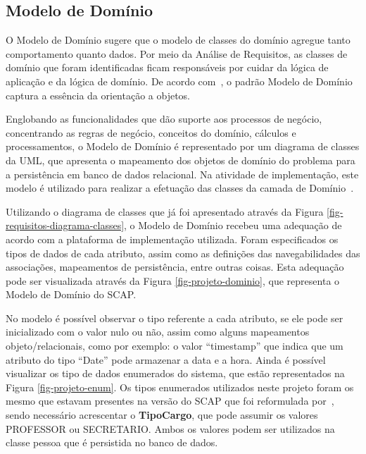 \subsection{Modelo de Domínio}
\label{sec-projeto-modelo-dominio}

O Modelo de Domínio sugere que o modelo de classes do domínio agregue tanto comportamento quanto dados. Por meio da Análise de Requisitos, as classes de domínio que foram identificadas ficam responsáveis por cuidar da lógica de aplicação e da lógica de domínio. De acordo com~, o padrão Modelo de Domínio captura a essência da orientação a objetos.

Englobando as funcionalidades que dão suporte aos processos de negócio, concentrando as regras de negócio, conceitos do domínio, cálculos e processamentos, o Modelo de Domínio é representado por um diagrama de classes da UML, que apresenta o mapeamento dos objetos de domínio do problema para a persistência em banco de dados relacional. Na atividade de implementação, este modelo é utilizado para realizar a efetuação das classes da camada de Domínio~\cite{souza:masterthesis07}.

Utilizando o diagrama de classes que já foi apresentado através da Figura \ref{fig-requisitos-diagrama-classes}, o Modelo de Domínio recebeu uma adequação de acordo com a plataforma de implementação utilizada. Foram especificados os tipos de dados de cada atributo, assim como as definições das navegabilidades das associações, mapeamentos de persistência, entre outras coisas. Esta adequação pode ser visualizada através da Figura \ref{fig-projeto-dominio}, que representa o Modelo de Domínio do SCAP.

No modelo é possível observar o tipo referente a cada atributo, se ele pode ser inicializado com o valor nulo ou não, assim como alguns mapeamentos objeto/relacionais, como por exemplo: o valor ``timestamp'' que indica que um atributo do tipo ``Date'' pode armazenar a data e a hora. Ainda é possível visualizar os tipo de dados enumerados do sistema, que estão representados na Figura \ref{fig-projeto-enum}. Os tipos enumerados utilizados neste projeto foram os mesmo que estavam presentes na versão do SCAP que foi reformulada por~, sendo necessário acrescentar o \textbf{TipoCargo}, que pode assumir os valores PROFESSOR ou SECRETARIO. Ambos os valores podem ser utilizados na classe pessoa que é persistida no banco de dados.   

